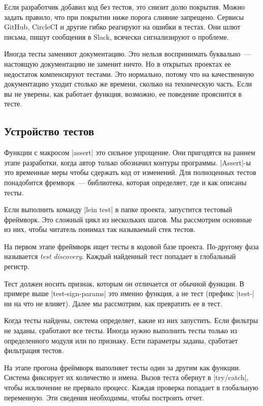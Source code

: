 Если разработчик добавил код без тестов, это снизит долю покрытия. Можно задать
правило, что при покрытии ниже порога слияние запрещено. Сервисы GitHub,
CircleCI и другие гибко реагируют на ошибки в тестах. Они шлют письма, пишут
сообщения в Slack, всячески сигнализируют о проблеме.

Иногда тесты заменяют документацию. Это нельзя воспринимать буквально~---
настоящую документацию не заменит ничто. Но в открытых проектах ее недостаток
компенсируют тестами. Это нормально, потому что на качественную документацию
уходит столько же времени, сколько на техническую часть. Если вы не уверены, как
работает функция, возможно, ее поведение прояснится в тесте.

\subsection{Устройство тестов}

Функции с макросом \spverb|assert| это сильное упрощение. Они пригодятся на
раннем этапе разработки, когда автор только обозначил контуры
программы. \spverb|Assert|-ы это временные меры чтобы сдержать код от
изменений. Для полноценных тестов понадобится фремворк~--- библиотека, которая
определяет, где и как описаны тесты.

Если выполнить команду \spverb|lein test| в папке проекта, запустится тестовый
фреймворк. Это сложный цикл из нескольких шагов. Мы рассмотрим основные из них,
чтобы читатель понимал так называемый стек тестов.

На первом этапе фреймворк ищет тесты в кодовой базе проекта. По-другому фаза
называется \emph{test discovery}. Каждый найденный тест попадает в глобальный
регистр.

Тест должен носить признак, которым он отличается от обычной функции. В примере
выше \spverb|test-sign-params| это именно функция, а не тест (префикс
\spverb|test-| ни на что не влияет). Далее мы рассмотрим, как превратить ее в
тест.

Когда тесты найдены, система определяет, какие из них запустить. Если фильтры не
заданы, сработают все тесты. Иногда нужно выполнить тесты только из
определенного модуля или по признаку. Ести параметры заданы, сработает
фильтрация тестов.

На этапе прогона фреймворк выполняет тесты один за другим как функции. Система
фиксирует их количество и имена. Вызов теста обернут в \spverb|try/catch|, чтобы
исключение не прервало процесс. Каждая проверка попадает в глобальную
переменную. Эти сведения необходимы, чтобы построить отчет.

